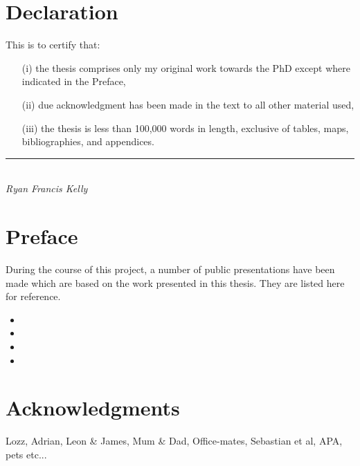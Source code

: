 

\chapter*{Declaration}
This is to certify that:
\begin{itemize}
\item[(i)] the thesis comprises only my original work towards the PhD except where indicated in the Preface,
\item[(ii)] due acknowledgment has been made in the text to all other material used,
\item[(iii)] the thesis is less than 100,000 words in length, exclusive of tables, maps, bibliographies, and appendices.
\end{itemize}
\vspace{3cm}
\rule{70mm}{0.1mm}\\
\emph{Ryan Francis Kelly}

\chapter*{Preface}
During the course of this project, a number of public presentations have been
 made which are based on the work presented in this thesis. They are listed
 here for reference.

\nobibliography*
\begin{itemize}
\item {}
\item {}
\item {}
\item {}
\end{itemize}


\chapter*{Acknowledgments} %

Lozz, Adrian, Leon \& James, Mum \& Dad, Office-mates, Sebastian et al, APA, pets etc...

\singlespace
\tableofcontents
\listoftables
\listoffigures

\newpage
{}









\appendix


\singlespace




